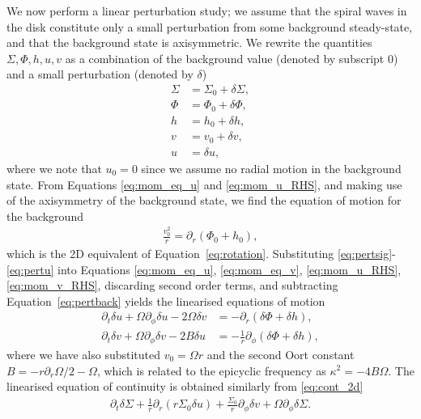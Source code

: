 We now perform a linear perturbation study; we assume that the spiral waves in the disk constitute only a small perturbation from some background steady-state, and that the background state is axisymmetric.
We rewrite the quantities $\Sigma,\Phi,h,u,v$ as a combination of the background value (denoted by subscript 0) and a small perturbation  (denoted by $\delta$)
\begin{align}
    \Sigma &= \Sigma_0 + \delta\Sigma, \label{eq:pertsig} \\
    \Phi &= \Phi_0 + \delta\Phi, \label{eq:pertphi} \\
    h &= h_0 + \delta h, \label{eq:perth} \\
    v &= v_0 + \delta v, \label{eq:pertv} \\ 
    u &= \delta u, \label{eq:pertu}
\end{align}
where we note that $u_0=0$ since we assume no radial motion in the background state.
From Equations \eqref{eq:mom_eq_u} and \eqref{eq:mom_u_RHS}, and making use of the axisymmetry of the background state, we find the equation of motion for the background
\begin{align}
    \frac{v_0^2}{r} = \partial_r \left( \Phi_0 + h_0  \right), \label{eq:pertback}
\end{align}
which is the 2D equivalent of Equation~\eqref{eq:rotation}. 
Substituting \eqref{eq:pertsig}-\eqref{eq:pertu} into Equations \eqref{eq:mom_eq_u}, \eqref{eq:mom_eq_v}, \eqref{eq:mom_u_RHS}, \eqref{eq:mom_v_RHS}, discarding second order terms, and subtracting Equation~\eqref{eq:pertback} yields the linearised equations of motion 
\begin{align}
    \partial_t \delta u + \Omega \partial_\phi \delta u - 2 \Omega \delta v &= - \partial_r \left( \delta \Phi + \delta h  \right), \label{eq:mom_u_lin} \\
    \partial_t \delta v + \Omega \partial_\phi \delta v - 2 B \delta u &= - \frac{1}{r} \partial_\phi \left( \delta \Phi + \delta h  \right), \label{eq:mom_v_lin}
\end{align}
where we have also substituted $v_0=\Omega r$ and the second Oort constant $B = -r \partial_r \Omega / 2 -\Omega$, which is related to the epicyclic frequency as $\kappa^2 = -4 B \Omega$. 
The linearised equation of continuity is obtained similarly from \eqref{eq:cont_2d}
\begin{align}
    \partial_t \delta \Sigma + \frac{1}{r} \partial_r \left( r \Sigma_0 \delta u  \right) + \frac{\Sigma_0}{r} \partial_\phi \delta v + \Omega \partial_\phi \delta \Sigma. \label{eq:cont_lin}
\end{align}
